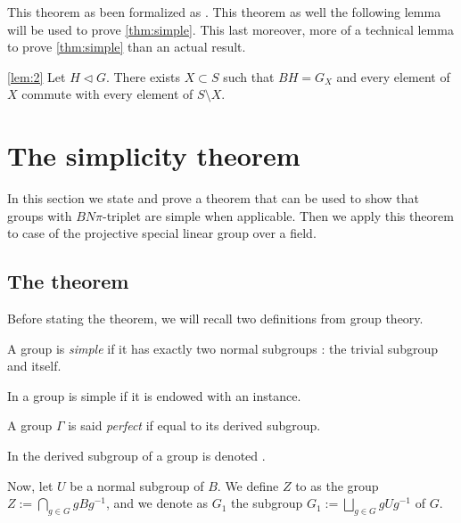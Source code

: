 This theorem as been formalized as . This theorem as well the following lemma will be used to prove \ref{thm:simple}. This last moreover, more of a technical lemma to prove \ref{thm:simple} than an actual result.

\begin{lemme} \ref{lem:2}
Let $H \triangleleft G$. There exists $X \subset S$ such that $BH = G_X$ and every element of $X$ commute with every element of $S \setminus X$.
\end{lemme}

\section{The simplicity theorem}%
\label{sec:The simplicity theorem}

In this section we state and prove a theorem that can be used to show that groups with $BN\pi$-triplet are simple when applicable. Then we apply this theorem to case of the projective special linear group over a field.

\subsection{The theorem}
Before stating the theorem, we will recall two definitions from group theory.

\begin{definition}
    A group is \emph{simple} if it has exactly two normal subgroups : the trivial subgroup and itself.
\end{definition}

In \Lean a group  is simple if it is endowed with an  instance.

\begin{definition}
    A group $\Gamma$ is said \emph{perfect} if equal to its derived subgroup.
\end{definition}

In \Lean the derived subgroup of a group  is denoted . 
    

    Now, let $U$ be a normal subgroup of $B$. We define $Z$ to as the group $Z := \bigcap_{g \in G} g B g^{-1}$, and we denote as  $G_1$ the subgroup $G_1 := \bigsqcup_{g \in G} g U g^{-1}$ of $G$.

